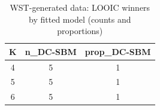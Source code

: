 \begin{table}[!h]
\centering
\caption{WST-generated data: LOOIC winners by fitted model (counts and proportions)\\\label{tab:wst-loo-winners}}
\centering
\begin{tabular}[t]{ccc}
\toprule
K & n_DC-SBM & prop_DC-SBM\\
\midrule
4 & 5 & 1\\
5 & 5 & 1\\
6 & 5 & 1\\
\bottomrule
\end{tabular}
\end{table}
